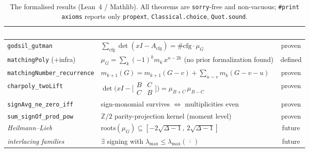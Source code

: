 
\begin{table}[t]
  \centering
  \small
  \caption{The formalised results (Lean~4 / Mathlib). All theorems are
  \texttt{sorry}-free and non-vacuous; \texttt{\#print axioms} reports only
  \texttt{propext}, \texttt{Classical.choice}, \texttt{Quot.sound}.}
  \label{tab:results}
  \begin{tabular}{@{}llc@{}}
    \toprule
    \rowcolor{ggteal}
    \textcolor{white}{\textbf{Lean name}} & \textcolor{white}{\textbf{Statement}} & \textcolor{white}{\textbf{Status}} \\
    \midrule
    \rowcolor{ggband}
    \texttt{godsil\_gutman} & $\sum_{\mathrm{cfg}}\det(xI-A_{\mathrm{cfg}})=\#\mathrm{cfg}\cdot\mu_G$ & proven \\
    \texttt{matchingPoly} (+infra) & $\mu_G=\sum_k(-1)^k m_k\,x^{n-2k}$ (no prior formalization found) & defined \\
    \rowcolor{ggband}
    \texttt{matchingNumber\_recurrence} & $m_{k+1}(G)=m_{k+1}(G{-}v)+\sum_{u\sim v} m_k(G{-}v{-}u)$ & proven \\
    \texttt{charpoly\_twoLift} & $\det\!\bigl(xI-\bigl[\begin{smallmatrix}B&C\\C&B\end{smallmatrix}\bigr]\bigr)=\mu_{B+C}\,\mu_{B-C}$ & proven \\
    \rowcolor{ggband}
    \texttt{signAvg\_ne\_zero\_iff} & sign-monomial survives $\iff$ multiplicities even & proven \\
    \texttt{sum\_signOf\_prod\_pow} & $\mathbb{Z}/2$ parity-projection kernel (moment level) & proven \\
    \midrule
    \emph{Heilmann--Lieb} & $\mathrm{roots}(\mu_G)\subseteq[-2\sqrt{\Delta-1},\,2\sqrt{\Delta-1}]$ & future \\
    \rowcolor{ggband}
    \emph{interlacing families} & $\exists$ signing with $\lambda_{\max}\le\lambda_{\max}(\overline{\,\cdot\,})$ & future \\
    \bottomrule
  \end{tabular}
\end{table}

